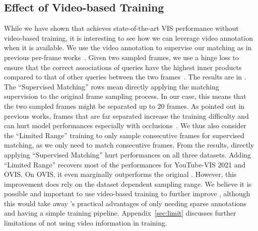 \subsection{Effect of Video-based Training} 
\label{sec:sup}

While we have shown that \ours achieves state-of-the-art VIS performance without video-based training, it is interesting to see how we can leverage video annotation when it is available. We use the video annotation to supervise our matching as in previous per-frame works~\cite{yang2019video,yang2021crossover,QueryTrack}. Given two sampled frames, we use a hinge loss  to  ensure that the correct associations of queries have the highest inner products compared to that of other queries between the two frames~\cite{QueryTrack}. The results are in  . The ``Supervised Matching'' rows mean directly applying the matching supervision to the original frame sampling process. In our case, this means that the two sampled frames might be separated up to 20 frames. As pointed out in previous works, frames that are far separated increase the training difficulty and can hurt model performances especially with occlusions~\cite{li2021limited}. We thus also consider the ``Limited Range'' training to only sample consecutive frames for supervised matching, as we only need to match consecutive frames. From the results, directly applying ``Supervised Matching'' hurt performances on all three datasets. Adding ``Limited Range'' recovers most of the performances for YouTube-VIS 2021 and OVIS. On OVIS, it even marginally outperforms the original \ours. However, this improvement does rely on the dataset dependent sampling range. We believe it is possible and important to use video-based training to further improve \ours, although this would take away \ours's practical advantages of only needing sparse annotations and having a simple training pipeline. Appendix~\ref{sec:limit} discusses further limitations of not using video information in training.